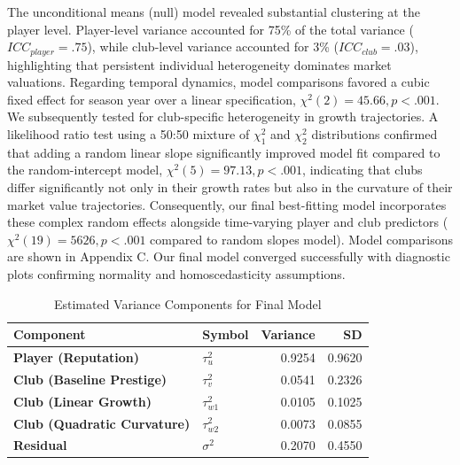 \documentclass[
  12pt,
]{article}
\begin{document}
The unconditional means (null) model revealed substantial clustering at
the player level. Player-level variance accounted for 75\% of the total
variance (\(ICC_{player}=.75\)), while club-level variance accounted for
3\% (\(ICC_{club}=.03\)), highlighting that persistent individual
heterogeneity dominates market valuations. Regarding temporal dynamics,
model comparisons favored a cubic fixed effect for season year over a
linear specification, \(\chi^2(2)=45.66, p<.001\). We subsequently
tested for club-specific heterogeneity in growth trajectories. A
likelihood ratio test using a 50:50 mixture of \(\chi^2_1\) and
\(\chi^2_2\) distributions confirmed that adding a random linear slope
significantly improved model fit compared to the random-intercept model,
\(\chi^2(5)=97.13, p<.001\), indicating that clubs differ significantly
not only in their growth rates but also in the curvature of their market
value trajectories. Consequently, our final best-fitting model
incorporates these complex random effects alongside time-varying player
and club predictors (\(\chi^2(19)=5626, p<.001\) compared to random
slopes model). Model comparisons are shown in Appendix C. Our final
model converged successfully with diagnostic plots confirming normality
and homoscedasticity assumptions.

\begin{table}[H]
\centering
\caption{Estimated Variance Components for Final Model}
\centering
\fontsize{11}{13}\selectfont
\begin{tabular}[t]{>{}llrr}
\toprule
Component & Symbol & Variance & SD\\
\midrule
\textbf{Player (Reputation)} & $\tau^2_u$ & 0.9254 & 0.9620\\
\textbf{Club (Baseline Prestige)} & $\tau^2_v$ & 0.0541 & 0.2326\\
\textbf{Club (Linear Growth)} & $\tau^2_{w1}$ & 0.0105 & 0.1025\\
\textbf{Club (Quadratic Curvature)} & $\tau^2_{w2}$ & 0.0073 & 0.0855\\
\textbf{Residual} & $\sigma^2$ & 0.2070 & 0.4550\\
\bottomrule
\end{tabular}
\end{table}
\end{document}
